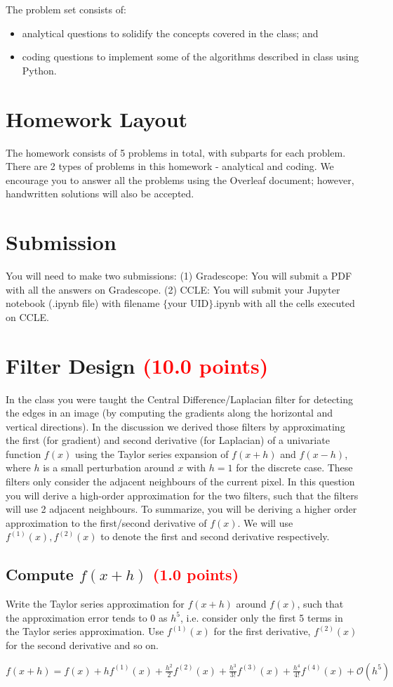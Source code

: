 \documentclass[answers]{exam}
\newcommand{\mypoints}[1]{\textcolor{red}{(#1 points)}}
\begin{document}
The problem set consists of: 
\begin{itemize}
    \item analytical questions to solidify the concepts covered in the class; and
    \item coding questions to implement some of the algorithms described in class using Python.
\end{itemize}

\section*{Homework Layout}
The homework consists of 5 problems in total, with subparts for each problem. There are 2 types of problems in this homework - analytical and coding. We encourage you to answer all the problems using the Overleaf document; however, handwritten solutions will also be accepted. 

\section*{Submission}

You will need to make two submissions: (1) Gradescope: You will submit a PDF with all the answers on Gradescope. (2) CCLE: You will submit your Jupyter notebook (.ipynb file) with filename $\{$your UID$\}$.ipynb with all the cells executed on CCLE. 


\newpage
\section{Filter Design \mypoints{10.0}}
In the class you were taught the Central Difference/Laplacian filter for detecting the edges in an image (by computing the gradients along the horizontal and vertical directions). In the discussion we derived those filters by approximating the first (for gradient) and second derivative (for Laplacian) of a univariate function $f(x)$ using the Taylor series expansion of $f(x+h)$ and $f(x-h)$, where $h$ is a small perturbation around $x$ with $h=1$ for the discrete case. These filters only consider the adjacent neighbours of the current pixel. In this question you will derive a high-order approximation for the two filters, such that the filters will use 2 adjacent neighbours. To summarize, you will be deriving a higher order approximation to the first/second derivative of $f(x)$. We will use $f^{(1)}(x),f^{(2)}(x)$ to denote the first and second derivative respectively.

\subsection{Compute $f(x+h)$ \mypoints{1.0}}
Write the Taylor series approximation for $f(x+h)$ around $f(x)$, such that the approximation error tends to 0 as $h^5$, i.e. consider only the first 5 terms in the Taylor series approximation. Use $f^{(1)}(x)$ for the first derivative, $f^{(2)}(x)$ for the second derivative and so on. 
\begin{solution} 
$
f(x+h)=f(x)+h f^{(1)}(x)+\frac{h^{2}}{2} f^{(2)}(x)+\frac{h^{3}}{3 !} f^{(3)}(x)+\frac{h^{4}}{4 !} f^{(4)}(x)+\mathcal O\left(h^{5}\right)
$
\end{solution}
\end{document}
